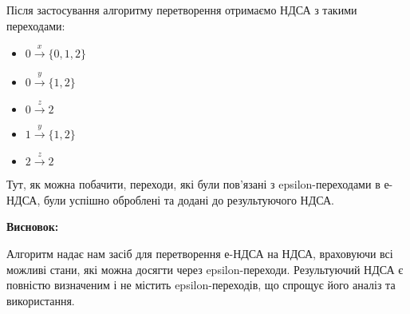 \documentclass[12pt,a4paper]{article}
\begin{document}
Після застосування алгоритму перетворення отримаємо НДСА з такими переходами:
\begin{itemize}
    \item \(0 \xrightarrow{x} \{0, 1, 2\}\)
    \item \(0 \xrightarrow{y} \{1, 2\}\)
    \item \(0 \xrightarrow{z} 2\)
    \item \(1 \xrightarrow{y} \{1, 2\}\)
    \item \(2 \xrightarrow{z} 2\)
\end{itemize}

Тут, як можна побачити, переходи, які були пов'язані з epsilon-переходами в е-НДСА, були успішно оброблені та додані до результуючого НДСА.

\vspace{1em}
\textbf{Висновок:}
\vspace{0.5em}

Алгоритм надає нам засіб для перетворення е-НДСА на НДСА, враховуючи всі можливі стани, які можна досягти через epsilon-переходи. Результуючий НДСА є повністю визначеним і не містить epsilon-переходів, що спрощує його аналіз та використання.
\end{document}
